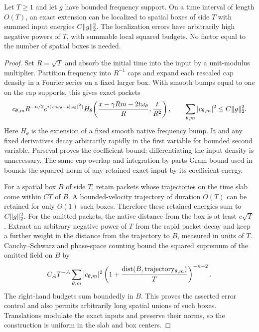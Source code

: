 \begin{lemma}
\label{d:packet-expansion}
Let $T\ge1$ and let $g$ have bounded frequency support.  On a time
interval of length $O(T)$, an exact extension can be localized to
spatial boxes of side $T$ with summed input energies
$C\lVert g\rVert_2^2$.  The localization errors have arbitrarily high negative
powers of $T$, with summable local squared budgets.  No factor equal
to the number of spatial boxes is needed.
\end{lemma}

\begin{proof}
Set $R=\sqrt T$ and absorb the initial time into the input by a
unit-modulus multiplier.  Partition frequency into $R^{-1}$ caps and
expand each rescaled cap density in a Fourier series on a fixed larger
box.  With smooth bumps equal to one on the cap supports, this gives
exact packets
\[
 c_{\theta,m}R^{-n/2}e^{i(x\cdot\omega_\theta-t|\omega_\theta|^2)}
 H_\theta\!\left(
     \frac{x-\gamma Rm-2t\omega_\theta}{R},\frac t{R^2}\right),
 \qquad \sum_{\theta,m}|c_{\theta,m}|^2\le C\lVert g\rVert_2^2.
\]
Here $H_\theta$ is the extension of a fixed smooth native frequency
bump.  It and any fixed derivatives decay arbitrarily rapidly in the
first variable for bounded second variable.  Parseval proves the
coefficient bound; differentiating the input density is unnecessary.
The same cap-overlap and integration-by-parts Gram bound used in
 bounds the squared norm of any retained exact input by
its coefficient energy.

For a spatial box $B$ of side $T$, retain packets whose trajectories
on the time slab come within $CT$ of $B$.  A bounded-velocity
trajectory of duration $O(T)$ can be retained for only $O(1)$ such
boxes.  Therefore these retained energies sum to
$C\lVert g\rVert_2^2$.  For the omitted packets, the native distance from the
box is at least $c\sqrt T$.  Extract an arbitrary negative power of
$T$ from the rapid packet decay and keep a further weight in the
distance from the trajectory to $B$, measured in units of $T$.
Cauchy--Schwarz and phase-space counting bound the squared supremum of
the omitted field on $B$ by
\[
 C_A T^{-A}\sum_{\theta,m}|c_{\theta,m}|^2
       \left(1+\frac{\operatorname{dist}(B,\text{trajectory}_{\theta,m})}{T}
       \right)^{-n-2}.
\]
The right-hand budgets sum boundedly in $B$.  This proves the asserted
error control and also permits arbitrarily long spatial unions of
such boxes.  Translations modulate the exact inputs and preserve their
norms, so the construction is uniform in the slab and box centers.
\end{proof}

